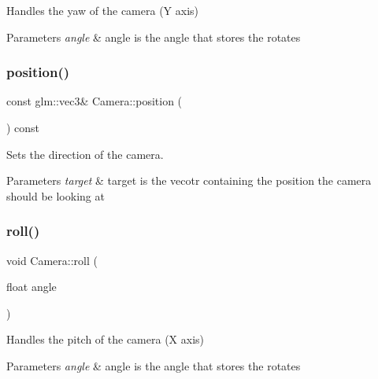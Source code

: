 Handles the yaw of the camera (Y axis) 


\begin{DoxyParams}{Parameters}
{\em angle} & angle is the angle that stores the rotates \\
\hline
\end{DoxyParams}
\mbox{\label{class_camera_a26f5c28317ec7add2a21ddbdc8e463fb}} 
\subsubsection{\texorpdfstring{position()}{position()}}
{\footnotesize\ttfamily const glm\+::vec3\& Camera\+::position (\begin{DoxyParamCaption}{ }\end{DoxyParamCaption}) const\hspace{0.3cm}{\ttfamily [inline]}}



Sets the direction of the camera. 


\begin{DoxyParams}{Parameters}
{\em target} & target is the vecotr containing the position the camera should be looking at \\
\hline
\end{DoxyParams}
\mbox{\label{class_camera_a72be99f88b1cc21122178109d3441818}} 
\subsubsection{\texorpdfstring{roll()}{roll()}}
{\footnotesize\ttfamily void Camera\+::roll (\begin{DoxyParamCaption}\item[{float}]{angle }\end{DoxyParamCaption})\hspace{0.3cm}{\ttfamily [inline]}}



Handles the pitch of the camera (X axis) 


\begin{DoxyParams}{Parameters}
{\em angle} & angle is the angle that stores the rotates \\
\hline
\end{DoxyParams}
\mbox{\label{class_camera_a0e6180b5a8da63a999db3de1802c8f4c}} 
